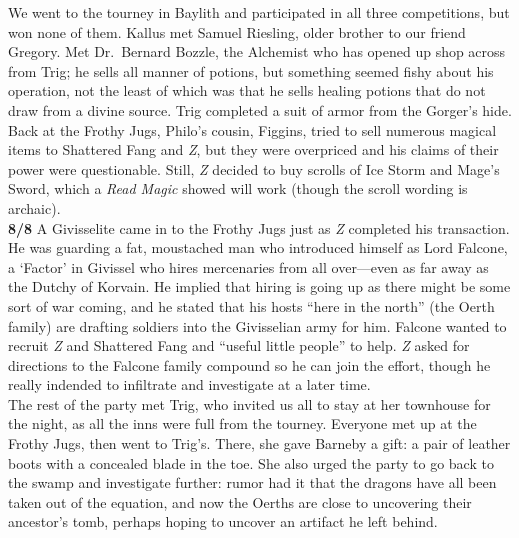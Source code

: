 \documentclass[letterpaper]{article}
\begin{document}
\noindent We went to the tourney in Baylith and participated in all three competitions, but won none of them. Kallus met Samuel Riesling, older brother to our friend Gregory.  Met Dr.\ Bernard Bozzle, the Alchemist who has opened up shop across from Trig; he sells all manner of potions, but something seemed fishy about his operation, not the least of which was that he sells healing potions that do not draw from a divine source.  Trig completed a suit of armor from the Gorger's hide. Back at the Frothy Jugs, Philo's cousin, Figgins, tried to sell numerous magical items to Shattered Fang and \emph{Z}, but they were overpriced and his claims of their power were questionable. Still, \emph{Z} decided to buy scrolls of Ice Storm and Mage's Sword, which a \emph{Read Magic} showed will work (though the scroll wording is archaic).\\

\noindent \textbf{8/8} A Givisselite came in to the Frothy Jugs just as \emph{Z} completed his transaction.  He was guarding a fat, moustached man who introduced himself as Lord Falcone, a `Factor' in Givissel who hires mercenaries from all over---even as far away as the Dutchy of Korvain.  He implied that hiring is going up as there might be some sort of war coming, and he stated that his hosts ``here in the north'' (the Oerth family) are drafting soldiers into the Givisselian army for him.  Falcone wanted to recruit \emph{Z} and Shattered Fang and ``useful little people'' to help. \emph{Z} asked for directions to the Falcone family compound so he can join the effort, though he really indended to infiltrate and investigate at a later time.\\

\noindent The rest of the party met Trig, who invited us all to stay at her townhouse for the night, as all the inns were full from the tourney.  Everyone met up at the Frothy Jugs, then went to Trig's.  There, she gave Barneby a gift: a pair of leather boots with a concealed blade in the toe. She also urged the party to go back to the swamp and investigate further: rumor had it that the dragons have all been taken out of the equation, and now the Oerths are close to uncovering their ancestor's tomb, perhaps hoping to uncover an artifact he left behind.\\
\end{document}
